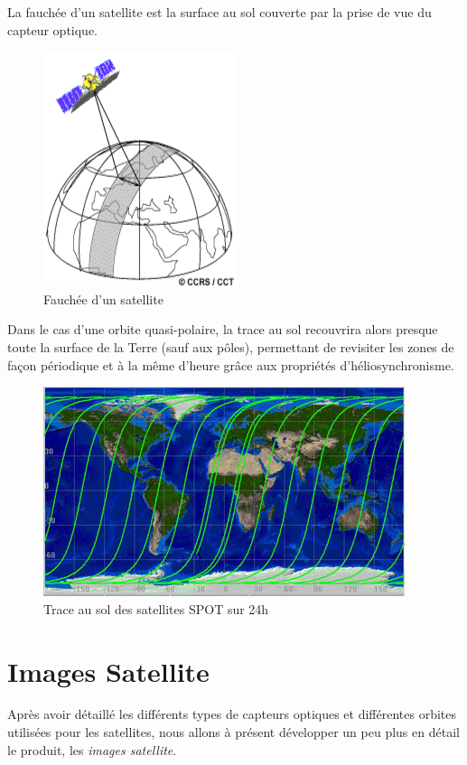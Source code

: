\documentclass[a4paper, 11pt]{report}
\begin{document}
La fauchée d'un satellite est la surface au sol couverte par la prise de vue du capteur optique.
\begin{figure}[H]
	\begin{center}
		\includegraphics[scale=0.5]{Images/Swath.png}
		\caption{Fauchée d'un satellite}
	\end{center}
\end{figure}
Dans le cas d'une orbite quasi-polaire, la trace au sol recouvrira alors presque toute la surface de la Terre (sauf aux pôles), permettant de revisiter les zones de façon périodique et à la même d'heure grâce aux propriétés d'héliosynchronisme.
\begin{figure}[H]
	\begin{center}
		\includegraphics[scale=0.6]{Images/Trace_Sol_SPOT.jpg}
		\caption{Trace au sol des satellites SPOT sur 24h}
	\end{center}
\end{figure}
\section{Images Satellite}
Après avoir détaillé les différents types de capteurs optiques et différentes orbites utilisées pour les satellites, nous allons à présent développer un peu plus en détail le produit, les \emph{images satellite}.
\end{document}
